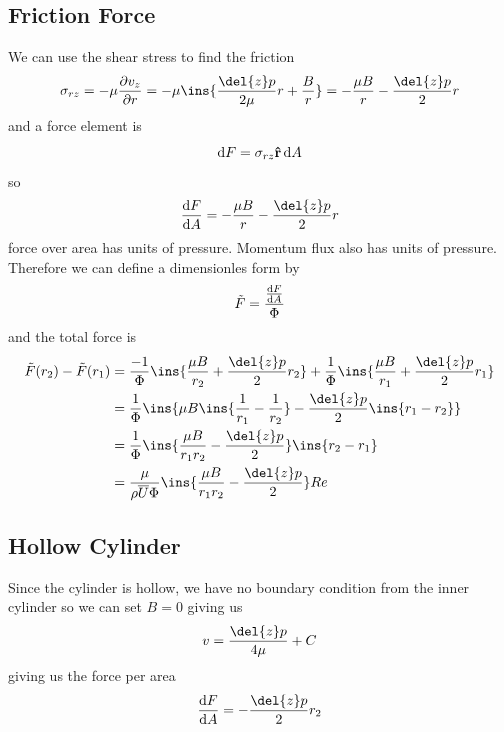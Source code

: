 \subsection{Friction Force}
We can use the shear stress to find the friction
\begin{equation}
    \sigma_{rz} = -\mu\pdv{v_z}{r}=-\mu \ins{\frac{\del{z}p}{2\mu}r+\frac{B}{r}} = -\frac{\mu B}{r}-\frac{\del{z}p}{2}r
\end{equation}
and a force element is
\begin{equation}
    \dd{F} = \sigma_{rz}\vu{r}\dd{A}
\end{equation}
so 
\begin{equation}
    \dv{F}{A} = -\frac{\mu B}{r}-\frac{\del{z}p}{2}r
\end{equation}
force over area has units of pressure. Momentum flux also has units of pressure. Therefore we can define a dimensionles form by 
\begin{equation}
    \tilde{F} = \frac{\dv{F}{A}}{\Phi}
\end{equation} 
and the total force is 
\begin{align}
    \tilde{F}(r_2)-\tilde{F}(r_1) &= \frac{-1}{\Phi}\ins{\frac{\mu B}{r_2}+\frac{\del{z}p}{2}r_2}+\frac{1}{\Phi}\ins{\frac{\mu B}{r_1}+\frac{\del{z}p}{2}r_1}\\
    &= \frac{1}{\Phi}\ins{\mu B \ins{\frac{1}{r_1}-\frac{1}{r_2}}-\frac{\del{z}p}{2}\ins{r_1-r_2}} \\
    &= \frac{1}{\Phi}\ins{\frac{\mu B}{r_1r_2}-\frac{\del{z}p}{2}}\ins{r_2-r_1} \\
    &= \frac{\mu}{\rho\overline{U}\Phi}\ins{\frac{\mu B}{r_1r_2}-\frac{\del{z}p}{2}}Re
\end{align}
\subsection{Hollow Cylinder}
Since the cylinder is hollow, we have no boundary condition from the inner cylinder so we can set \(B=0\) giving us
\begin{equation}
    v = \frac{\del{z}p}{4\mu}+C
\end{equation}
giving us the force per area 
\begin{equation}
    \dv{F}{A} = -\frac{\del{z}p}{2}r_2
\end{equation}
